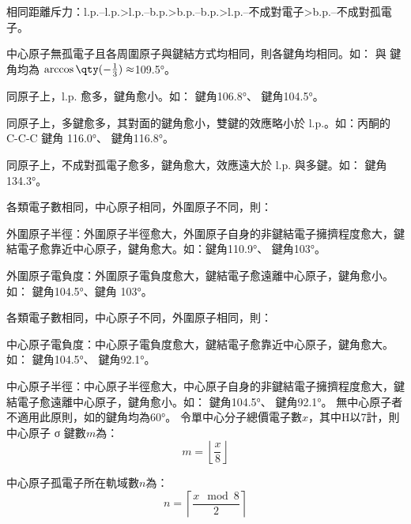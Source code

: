 \documentclass[a4paper,12pt]{report}
\begin{document}
相同距離斥力：l.p.–l.p.>l.p.–b.p.>b.p.–b.p.>l.p.–不成對電子>b.p.–不成對孤電子。
\bit
\item 中心原子無孤電子且各周圍原子與鍵結方式均相同，則各鍵角均相同。如： 與  鍵角均為 $\arccos\qty(-\frac{1}{3})\approx$109.5°。
\item 同原子上，l.p. 愈多，鍵角愈小。如： 鍵角106.8°、 鍵角104.5°。
\item 同原子上，多鍵愈多，其對面的鍵角愈小，雙鍵的效應略小於 l.p.。如：丙酮的 C-C-C 鍵角 116.0°、 鍵角116.8°。
\item 同原子上，不成對孤電子愈多，鍵角愈大，效應遠大於 l.p. 與多鍵。如： 鍵角134.3°。
\item 各類電子數相同，中心原子相同，外圍原子不同，則：
\bit
\item 外圍原子半徑：外圍原子半徑愈大，外圍原子自身的非鍵結電子擁擠程度愈大，鍵結電子愈靠近中心原子，鍵角愈大。如：鍵角110.9°、 鍵角103°。
\item 外圍原子電負度：外圍原子電負度愈大，鍵結電子愈遠離中心原子，鍵角愈小。如： 鍵角104.5°、鍵角 103°。
\eit
\item 各類電子數相同，中心原子不同，外圍原子相同，則：
\bit
\item 中心原子電負度：中心原子電負度愈大，鍵結電子愈靠近中心原子，鍵角愈大。如： 鍵角104.5°、 鍵角92.1°。
\item 中心原子半徑：中心原子半徑愈大，中心原子自身的非鍵結電子擁擠程度愈大，鍵結電子愈遠離中心原子，鍵角愈小。如： 鍵角104.5°、 鍵角92.1°。
\eit
\eit
無中心原子者不適用此原則，如的鍵角均為60°。
令單中心分子總價電子數$x$，其中H以7計，則中心原子 σ 鍵數$m$為：
\[m=\left\lfloor\frac{x}{8}\right\rfloor\]

中心原子孤電子所在軌域數$n$為：
\[n=\left\lceil\frac{x \mod 8}{2}\right\rceil\]
\end{document}
